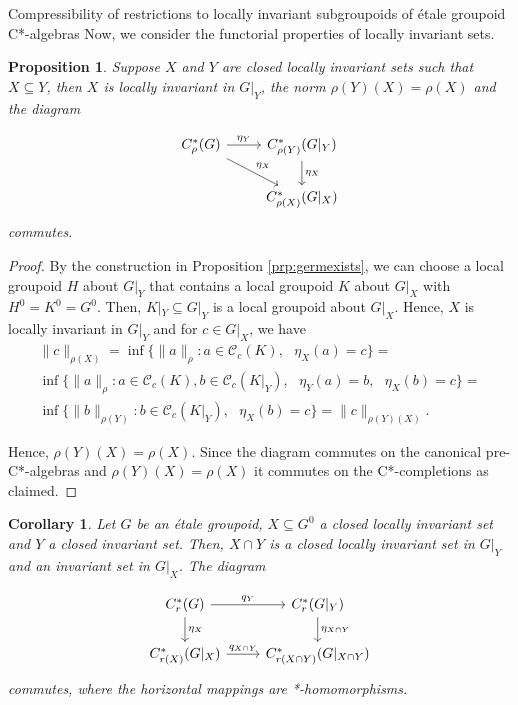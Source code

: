 \documentclass[a4paper, 12pt]{amsart}
\newtheorem{cor}[thm]{Corollary}
\newtheorem{prp}[thm]{Proposition}
\theoremstyle{definition}
\theoremstyle{remark}
\numberwithin{equation}{section}
\begin{document}
\begin{section}{Compressibility of restrictions to locally invariant subgroupoids of \'etale groupoid C*-algebras}
Now, we consider the functorial properties of locally invariant sets.

\begin{prp}
    Suppose $X$ and $Y$ are closed locally invariant sets such that $X\subseteq Y$, then $X$ is locally invariant in $G|_{Y}$, the norm $\rho(Y)(X) = \rho(X)$ and the diagram

    $$
\begin{tikzcd}
C^{*}_{\rho}(G) \arrow[rd, "\eta_{X}"] \arrow[r, "\eta_{Y}"] & C^{*}_{\rho(Y)}(G|_{Y}) \arrow[d, "\eta_{X}"] \\
                                                             & C^{*}_{\rho(X)}(G|_{X})                      
\end{tikzcd}$$ commutes.
\end{prp}

\begin{proof}
    By the construction in Proposition \ref{prp:germexists}, we can choose a local groupoid $H$ about $G|_{Y}$ that contains a local groupoid  $K$ about $G|_{X}$ with $H^{0} = K^{0} = G^{0}$. Then, $K|_{Y}\subseteq G|_{Y}$ is a local groupoid about $G|_{X}$. Hence, $X$ is locally invariant in $G|_{Y}$ and for $c\in G|_{X}$, we have 
    \begin{align*}
        \|c\|_{\rho(X)} = \inf\{\|a\|_{\rho}:a\in\mathscr{C}_{c}(K),\text{ }\eta_{X}(a) = c\} =
        \\\inf\{\|a\|_{\rho}:a\in \mathscr{C}_{c}(K), b\in \mathscr{C}_{c}(K|_{Y}),\text{ }\eta_{Y}(a) = b,\text{ }\eta_{X}(b) = c\} = 
        \\\inf\{\|b\|_{\rho(Y)}:b\in \mathscr{C}_{c}(K|_{Y}),\text{ }\eta_{X}(b) = c\} = \|c\|_{\rho(Y)(X)}.
    \end{align*}

    Hence, $\rho(Y)(X) = \rho(X)$. Since the diagram commutes on the canonical pre-C*-algebras and $\rho(Y)(X) = \rho(X)$ it commutes on the C*-completions as claimed.
\end{proof}

\begin{cor}
\label{cor:commdiagrest}
    Let $G$ be an \'etale groupoid, $X\subseteq G^{0}$ a closed locally invariant set and $Y$ a closed invariant set. Then, $X\cap Y$ is a closed locally invariant set in $G|_{Y}$ and an invariant set in $G|_{X}$. The diagram

    $$
\begin{tikzcd}
C^{*}_{r}(G) \arrow[r, "q_{Y}"] \arrow[d, "\eta_{X}"] & C^{*}_{r}(G|_{Y}) \arrow[d, "\eta_{X\cap Y}"] \\
C_{r(X)}^{*}(G|_{X}) \arrow[r, "q_{X\cap Y}"]           & C_{r(X\cap Y)}^{*}(G|_{X\cap Y})          
\end{tikzcd}$$ commutes, where the horizontal mappings are *-homomorphisms. 


\end{cor}
\end{section}
\end{document}

